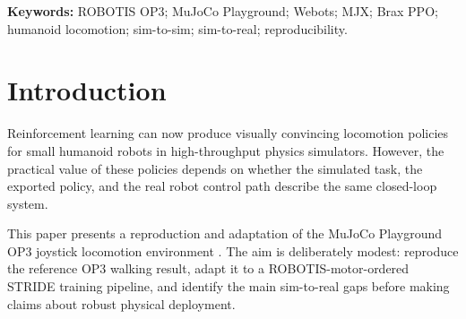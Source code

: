 \begin{abstract}



This paper reports a reproduction and deployment-oriented adaptation of the MuJoCo Playground OP3 joystick locomotion task for the ROBOTIS OP3 humanoid. The work is not presented as a novel reinforcement-learning algorithm. Instead, it documents the engineering path from a reference MuJoCo Playground policy to a STRIDE training and deployment pipeline: actuator-order alignment with ROBOTIS motor IDs, Brax PPO training in MJX, ONNX export, ROS~2 deployment, MuJoCo-to-Webots sim-to-sim testing through the ROBOTIS OP3 ROS~2 framework, and measurement-driven sim-to-real diagnosis. The main contribution is a set of practical lessons about why a policy that walks in simulation may fail on hardware: observation and reward conventions must match the reference implementation exactly, the deployment control path can accidentally filter policy commands, and the default OP3 actuator stiffness in the simulator is substantially softer than measured hardware behaviour. We argue that this kind of faithful reproduction and model-fidelity audit is a necessary precursor to credible sim-to-real claims for small humanoid locomotion.
\end{abstract}

\noindent\textbf{Keywords:} ROBOTIS OP3; MuJoCo Playground; Webots; MJX; Brax PPO; humanoid locomotion; sim-to-sim; sim-to-real; reproducibility.

\section{Introduction}
\label{sec:introduction}

Reinforcement learning can now produce visually convincing locomotion policies for small humanoid robots in high-throughput physics simulators. However, the practical value of these policies depends on whether the simulated task, the exported policy, and the real robot control path describe the same closed-loop system.

This paper presents a reproduction and adaptation of the MuJoCo Playground OP3 joystick locomotion environment \citep{Todorov2012-mujoco-physics-engine-model-based-control,Freeman2021-brax-differentiable-physics-engine-large-scale-rigid-body-simulation,Zakka2025-demonstrating-mujoco-playground,GoogleDeepMind2025-mujoco-playground}. The aim is deliberately modest: reproduce the reference OP3 walking result, adapt it to a ROBOTIS-motor-ordered STRIDE training pipeline, and identify the main sim-to-real gaps before making claims about robust physical deployment.

